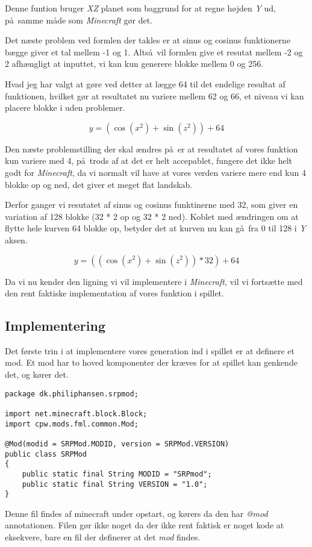 \documentclass[a4paper,12pt]{report}
\begin{document}
		Denne funtion bruger \emph{XZ} planet som baggrund for at regne højden \emph{Y} ud,
		p\aa \ samme m\aa de som \emph{Minecraft} g\o r det.

		Det n\ae ste problem ved formlen der takles er at sinus og cosinus funktionerne b\ae gge giver et tal mellem -1 og 1.
		Alts\aa \ vil formlen give et resutat mellem -2 og 2 afh\ae ngligt at inputtet, vi kan kun generere blokke mellem
		0 og 256.

		Hvad jeg har valgt at g\o re ved detter at l\ae gge 64 til det endelige resultat af funktionen, hvilket g\o r at resultatet
		nu variere mellem 62 og 66, et niveau vi kan placere blokke i uden problemer.

		\[y = (\cos (x^2) + \sin (z^2)) + 64\]

		Den n\ae ste problemstilling der skal \ae ndres p\aa \ er at resultatet af vores funktion kun variere med 4, p\aa \
		trods af at det er helt accepablet, fungere det ikke helt godt for \emph{Minecraft}, da vi normalt vil have at vores verden
		variere mere end kun 4 blokke op og ned, det giver et meget flat landskab.

		Derfor ganger vi resutatet af sinus og cosinus funktinerne med 32, som giver en variation af 128 blokke (32 * 2 op og 32 * 2 ned).
		Koblet med \ae ndringen om at flytte hele kurven 64 blokke op, betyder det at kurven nu kan g\aa \ fra 0 til 128 i \emph{Y} aksen.

		\[y = ((\cos (x^2) + \sin (z^2)) * 32) + 64\]

		Da vi nu kender den ligning vi vil implementere i \emph{Minecraft}, vil vi forts\ae tte med den rent faktiske implementation af vores
		funktion i spillet.
	\subsection{Implementering}
		Det f\o rste trin i at implementere vores generation ind i spillet er at definere et mod.
		Et mod har to hoved komponenter der kræves for at spillet kan genkende det, og k\o rer det.

\begin{lstlisting}[label=srpmod.java,caption=SRPMod.java]
package dk.philiphansen.srpmod;

import net.minecraft.block.Block;
import cpw.mods.fml.common.Mod;

@Mod(modid = SRPMod.MODID, version = SRPMod.VERSION)
public class SRPMod
{
    public static final String MODID = "SRPmod";
    public static final String VERSION = "1.0";
}
\end{lstlisting}
	Denne fil findes af minecraft under opstart, og k\o rers da den har \emph{@mod} annotationen.
	Filen g\o r ikke noget da der ikke rent faktisk er noget kode at eksekvere, bare en fil der definerer at det \emph{mod} findes.
\end{document}
